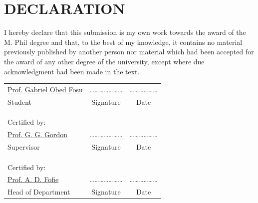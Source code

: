\chapter*{DECLARATION}


I hereby declare that this submission is my own work towards the award of the M. Phil degree and that, to the best of my knowledge, it contains no material previously published by another person nor material which had been accepted for the award of any other degree of the university, except where due acknowledgment had been made in the text.\\

\begin{center}
 \begin{tabular}{lcc}
 \underline{Prof. Gabriel Obed Fosu} &\quad\quad\quad \ldots\ldots\ldots\ldots\ldots\ldots\ldots &\quad\quad\quad \ldots\ldots\ldots\ldots\ldots\ldots \\
 Student &\quad\quad\quad Signature &\quad\quad\quad Date \\
 & & \\
 & & \\
 & & \\
  Certified by: & &\\
 \underline{Prof. G. G. Gordon} &\quad\quad\quad \ldots\ldots\ldots\ldots\ldots\ldots\ldots &\quad\quad\quad \ldots\ldots\ldots\ldots\ldots\ldots \\
 Supervisor &\quad\quad\quad Signature &\quad\quad\quad Date \\
 & & \\
 & & \\
 & & \\
 Certified by: & &\\
 \underline{Prof. A. D. Fofie} &\quad\quad\quad \ldots\ldots\ldots\ldots\ldots\ldots\ldots &\quad\quad\quad \ldots\ldots\ldots\ldots\ldots\ldots \\
 Head of Department &\quad\quad\quad Signature &\quad\quad\quad Date
\end{tabular}
\end{center}